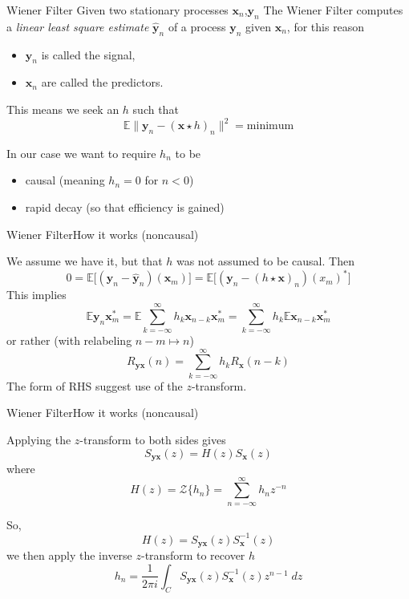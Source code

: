 \documentclass{beamer}  %
\newcommand{\E}{\mathbb{E}}
\newcommand{\zt}{\mathcal{Z}}
\begin{document}
\begin{frame}{Wiener Filter}
	Given two stationary processes $\textbf{x}_n$,$\textbf{y}_n$ The Wiener Filter computes a \emph{linear least square estimate} $\hat{\textbf{y}}_n$ of a process $\textbf{y}_n$ given  $\textbf{x}_n$, for this reason  
	\begin{itemize}
		\item $\textbf{y}_n$ is called the signal,
		\item $\textbf{x}_n$ are called the predictors.
	\end{itemize}

	This means we seek an $h$ such that
	$$\E\|\textbf{y}_n - (\textbf{x}\star h)_n\|^2 = \text{minimum}$$
	
	In our case we want to require $h_n$ to be 
	\begin{itemize}
		\item causal (meaning $h_n=0$ for $n<0$)
		\item rapid decay (so that efficiency is gained)
	\end{itemize}
	
\end{frame}


\begin{frame}{Wiener Filter}{How it works (noncausal)}
	
	We assume we have it, but that $h$ was not assumed to be causal. 
	Then
	$$ 0 = \E\big[(\textbf{y}_n - \hat{\textbf{y}}_n)(\textbf{x}_m)\big] = \E\big[(\textbf{y}_n - (h \star \textbf{x})_n)(x_m)^*\big]$$
	This implies 
	$$\E \textbf{y}_n\textbf{x}_m^* = \E \sum_{k=-\infty}^\infty h_{k}\textbf{x}_{n-k} \textbf{x}^*_m = \sum_{k=-\infty}^\infty h_{k} \E \textbf{x}_{n-k} \textbf{x}^*_m$$
	or rather (with relabeling $n-m \mapsto n$)
	$$R_{\textbf{yx}}(n) = \sum_{k=-\infty}^\infty h_{k} R_{\textbf{x}}(n-k)$$
	The form of RHS suggest use of the $z$-transform.
\end{frame}


\begin{frame}{Wiener Filter}{How it works (noncausal)}
	
	Applying the $z$-transform to both sides gives
	$$S_{\textbf{yx}}(z) = H(z) S_{\textbf{x}}(z)$$ 
	where
	$$H(z) = \zt\{h_n\} = \sum_{n=-\infty}^\infty h_nz^{-n}$$
	
	So, $$H(z) = S_{\textbf{yx}}(z)S^{-1}_{\textbf{x}}(z)$$
	we then apply the inverse $z$-transform to recover $h$
	$$h_n = \frac{1}{2\pi i}\int_C S_{\textbf{yx}}(z)S^{-1}_{\textbf{x}}(z)z^{n-1}\;dz$$
\end{frame}
\end{document}
